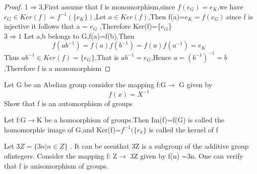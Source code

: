 \documentclass[cn,10pt,math=newtx,citestyle=gb7714-2015,bibstyle=gb7714-2015]{elegantbook}
\begin{document}
\begin{proof}
    1$\Rightarrow$3,First assume that f is monomorphism,since $f(e_G)=e_K$,we have $e_G\in Ker(f)=f^{-1}(\{e_K\})$,Let $a\in Ker(f)$,Then f(a)=$e_K=f(e_G)$.since f is injective it follows that a = $e_G$ ,Therefore Ker(f)=\{$e_G$\}\\
    3$\Rightarrow$1 Let a,b belongs to G,f(a)=f(b).Then \begin{equation*}
        f(ab^{-1})=f(a)f(b^{-1})=f(a)f(a^{-1})=e_K
    \end{equation*}
    Thus $ab^{-1}\in Ker(f)=\{e_G\}$,That is $ab^{-1}=e_G$,Hence $a=(b^{-1})^{-1}=b$,Therefore f is a monomorphism
\end{proof}
\begin{remark}
    Let G be an Abelian group consider the mapping f:G$\to$ G given by \begin{equation*}
        f(x)=X^{-1}
    \end{equation*}
    Show that f is an automorphism of groups
\end{remark}

\begin{definition}
    Let f:G$\to$K be a homoorphism of groups.Then Im(f)=f(G) is called the homomorphic image of G,and Ker(f)=$f^{-1}(\{e_k\}$ is called the kernel of f
\end{definition}

\begin{example}
    Let $3Z=\{3n|n\in Z\}$ . It can be seenthat 3Z is a subgroup of the additive group ofintegers. Consider the mapping f: Z$ \rightarrow $ 3Z given by f(n) =3n. One can verify that f is anisomorphism of groups. 
\end{example}
\end{document}
